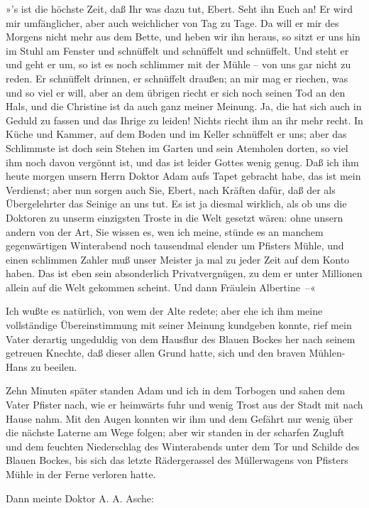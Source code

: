 »'s ist die höchste Zeit, daß Ihr was dazu tut, Ebert. Seht ihn
Euch an! Er wird mir umfänglicher, aber auch weichlicher von Tag zu
Tage. Da will er mir des Morgens nicht mehr aus dem Bette, und
heben wir ihn heraus, so sitzt er uns hin im Stuhl am Fenster und
schnüffelt und schnüffelt und schnüffelt. Und steht er und geht er
um, so ist es noch schlimmer mit der Mühle – von uns gar nicht zu
reden. Er schnüffelt drinnen, er schnüffelt draußen; an mir mag er
riechen, was und so viel er will, aber an dem übrigen riecht er
sich noch seinen Tod an den Hals, und die Christine ist da auch
ganz meiner Meinung. Ja, die hat sich auch in Geduld zu fassen und
das Ihrige zu leiden! Nichts riecht ihm an ihr mehr recht. In Küche
und Kammer, auf dem Boden und im Keller schnüffelt er uns; aber das
Schlimmste ist doch sein Stehen im Garten und sein Atemholen
dorten, so viel ihm noch davon vergönnt ist, und das ist leider
Gottes wenig genug. Daß ich ihm heute morgen unsern Herrn Doktor
Adam aufs Tapet gebracht habe, das ist mein Verdienst; aber nun
sorgen auch Sie, Ebert, nach Kräften dafür, daß der als
Übergelehrter das Seinige an uns tut. Es ist ja diesmal wirklich,
als ob uns die Doktoren zu unserm einzigsten Troste in die Welt
gesetzt wären: ohne unsern andern von der Art, Sie wissen es, wen
ich meine, stünde es an manchem gegenwärtigen Winterabend noch
tausendmal elender um Pfisters Mühle, und einen schlimmen Zahler
muß unser Meister ja mal zu jeder Zeit auf dem Konto haben. Das ist
eben sein absonderlich Privatvergnügen, zu dem er unter Millionen
allein auf die Welt gekommen scheint. Und dann Fräulein
Albertine~–«

Ich wußte es natürlich, von wem der Alte redete; aber ehe ich ihm
meine vollständige Übereinstimmung mit seiner Meinung kundgeben
konnte, rief mein Vater derartig ungeduldig von dem Hausflur des
Blauen Bockes her nach seinem getreuen Knechte, daß dieser allen
Grund hatte, sich und den braven Mühlen-Hans zu beeilen.

Zehn Minuten später standen Adam und ich in dem Torbogen und sahen
dem Vater Pfister nach, wie er heimwärts fuhr und wenig Trost aus
der Stadt mit nach Hause nahm. Mit den Augen konnten wir ihm und
dem Gefährt nur wenig über die nächste Laterne am Wege folgen; aber
wir standen in der scharfen Zugluft und dem feuchten Niederschlag
des Winterabends unter dem Tor und Schilde des Blauen Bockes, bis
sich das letzte Rädergerassel des Müllerwagens von Pfisters Mühle
in der Ferne verloren hatte.

Dann meinte Doktor A. A. Asche:


